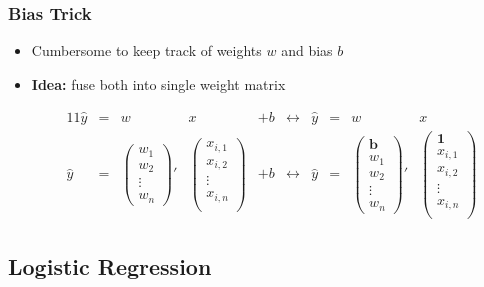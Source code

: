\documentclass[aspectratio=169]{beamer}
\begin{document}
\begin{frame}
\frametitle{Bias Trick}

\begin{itemize}
\item Cumbersome to keep track of weights $w$ and bias $b$
\item \textbf{Idea:} fuse both into single weight matrix

\begin{alignat*}{11}
\hat{y}&=&w&x&+b&\leftrightarrow&\hat{y}&=&w&x \\
\hat{y}&=&\begin{pmatrix}
w_{1} \\
w_{2} \\
\vdots \\
w_{n}
\end{pmatrix}'&
\begin{pmatrix}
x_{i,1}\\
x_{i,2}\\
\vdots\\
x_{i,n}\\
\end{pmatrix}&+b&\leftrightarrow&\hat{y}&=&
\begin{pmatrix}
\textbf{b} \\
w_{1} \\
w_{2} \\
\vdots \\
w_{n}
\end{pmatrix}'&
\begin{pmatrix}
\textbf{1}\\
x_{i,1}\\
x_{i,2}\\
\vdots\\
x_{i,n}\\
\end{pmatrix}
\end{alignat*}
\end{itemize}
\end{frame}

\subsection{Logistic Regression}
\label{subsec:logistic-regression}
\end{document}
